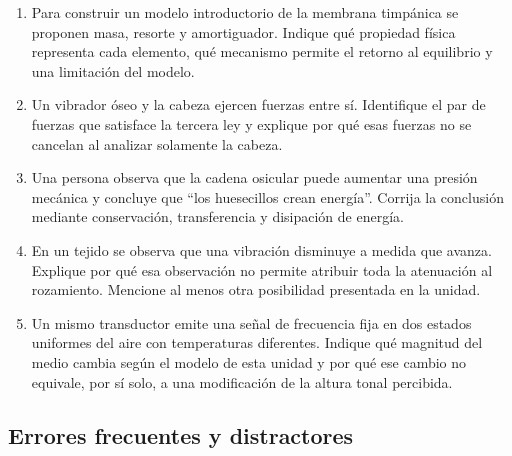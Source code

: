\begin{enumerate}[label=\textbf{F\arabic*.},leftmargin=*]
    \item Para construir un modelo introductorio de la membrana timpánica se
    proponen masa, resorte y amortiguador. Indique qué propiedad física
    representa cada elemento, qué mecanismo permite el retorno al equilibrio y
    una limitación del modelo.

    \item Un vibrador óseo y la cabeza ejercen fuerzas entre sí. Identifique el
    par de fuerzas que satisface la tercera ley y explique por qué esas fuerzas
    no se cancelan al analizar solamente la cabeza.

    \item Una persona observa que la cadena osicular puede aumentar una presión
    mecánica y concluye que ``los huesecillos crean energía''. Corrija la
    conclusión mediante conservación, transferencia y disipación de energía.

    \item En un tejido se observa que una vibración disminuye a medida que
    avanza. Explique por qué esa observación no permite atribuir toda la
    atenuación al rozamiento. Mencione al menos otra posibilidad presentada en
    la unidad.

    \item Un mismo transductor emite una señal de frecuencia fija en dos
    estados uniformes del aire con temperaturas diferentes. Indique qué
    magnitud del medio cambia según el modelo de esta unidad y por qué ese
    cambio no equivale, por sí solo, a una modificación de la altura tonal
    percibida.
\end{enumerate}

\subsection*{Errores frecuentes y distractores}

